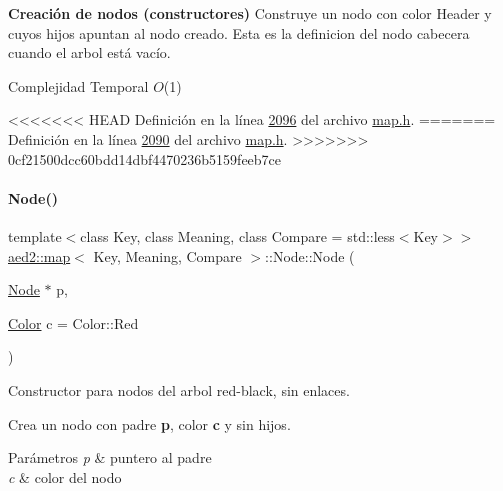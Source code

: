 \begin{Indent}{\bf \-Creación de nodos (constructores)}
Construye un nodo con color Header y cuyos hijos apuntan al nodo creado. Esta es la definicion del nodo cabecera cuando el arbol está vacío.


\begin{DoxyDescription}
\item[Complejidad Temporal]$O$(1)
\end{DoxyDescription}

<<<<<<< HEAD
\-Definición en la línea \hyperlink{map_8h_source_l02096}{2096} del archivo \hyperlink{map_8h_source}{map.\-h}.
=======
Definición en la línea \hyperlink{map_8h_source_l02090}{2090} del archivo \hyperlink{map_8h_source}{map.\+h}.
>>>>>>> 0cf21500dcc60bdd14dbf4470236b5159feeb7ce

\mbox{\label{structaed2_1_1map_1_1Node_a62b5a42e88e219d53af8237a9ebedb6e_a62b5a42e88e219d53af8237a9ebedb6e}} 
\paragraph{\texorpdfstring{Node()}{Node()}\hspace{0.1cm}{\footnotesize\ttfamily [2/2]}}
{\footnotesize\ttfamily template$<$class Key, class Meaning, class Compare = std\+::less$<$\+Key$>$$>$ \\
\hyperlink{classaed2_1_1map}{aed2\+::map}$<$ Key, Meaning, Compare $>$\+::Node\+::\+Node (\begin{DoxyParamCaption}\item[{\hyperlink{structaed2_1_1map_1_1Node}{Node} $\ast$}]{p,  }\item[{\hyperlink{classaed2_1_1map_a6d62a415a4b9d320b30cada4ebcf9f5b_a6d62a415a4b9d320b30cada4ebcf9f5b}{Color}}]{c = {\ttfamily Color\+:\+:Red} }\end{DoxyParamCaption})\hspace{0.3cm}{\ttfamily [inline]}}



Constructor para nodos del arbol red-\/black, sin enlaces. 

Crea un nodo con padre {\bfseries p}, color {\bfseries c} y sin hijos.


\begin{DoxyParams}{Parámetros}
{\em p} & puntero al padre \\
\hline
{\em c} & color del nodo\\
\hline
\end{DoxyParams}


\end{Indent}
